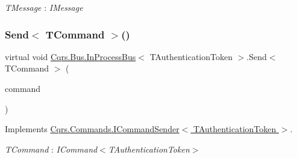 \begin{Desc}
\item[Type Constraints]\begin{description}
\item[{\em T\+Message} : {\em I\+Message}]\end{description}
\end{Desc}
\mbox{\label{classCqrs_1_1Bus_1_1InProcessBus_a6a074ef3663d2855875307b106fe4416_a6a074ef3663d2855875307b106fe4416}} 
\subsubsection{\texorpdfstring{Send$<$ T\+Command $>$()}{Send< TCommand >()}\hspace{0.1cm}{\footnotesize\ttfamily [1/2]}}
{\footnotesize\ttfamily virtual void \hyperlink{classCqrs_1_1Bus_1_1InProcessBus}{Cqrs.\+Bus.\+In\+Process\+Bus}$<$ T\+Authentication\+Token $>$.Send$<$ T\+Command $>$ (\begin{DoxyParamCaption}\item[{T\+Command}]{command }\end{DoxyParamCaption})\hspace{0.3cm}{\ttfamily [virtual]}}



Implements \hyperlink{interfaceCqrs_1_1Commands_1_1ICommandSender_a551d69f8679399fc0ce0fd99dead507a_a551d69f8679399fc0ce0fd99dead507a}{Cqrs.\+Commands.\+I\+Command\+Sender$<$ T\+Authentication\+Token $>$}.

\begin{Desc}
\item[Type Constraints]\begin{description}
\item[{\em T\+Command} : {\em I\+Command$<$T\+Authentication\+Token$>$}]\end{description}
\end{Desc}
\mbox{\label{classCqrs_1_1Bus_1_1InProcessBus_ae5dae5f2445387280c974ec181167055_ae5dae5f2445387280c974ec181167055}} 
